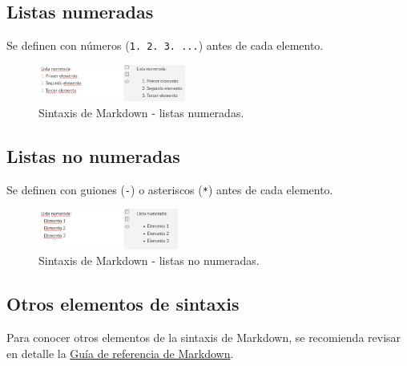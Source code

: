 \documentclass[
  letterpaper,
  DIV=11,
  numbers=noendperiod]{scrreprt}
\begin{document}
\hypertarget{listas-numeradas}{%
\subsection{Listas numeradas}\label{listas-numeradas}}

Se definen con números (\texttt{1.\ 2.\ 3.\ ...}) antes de cada
elemento.

\begin{figure}

{\centering \includegraphics[width=1.91in,height=\textheight]{./img/md-lista-numerada.png}

}

\caption{\label{fig-md-listas-numeradas}Sintaxis de Markdown - listas
numeradas.}

\end{figure}

\hypertarget{listas-no-numeradas}{%
\subsection{Listas no numeradas}\label{listas-no-numeradas}}

Se definen con guiones (\texttt{-}) o asteriscos (\texttt{*}) antes de
cada elemento.

\begin{figure}

{\centering \includegraphics[width=1.81in,height=\textheight]{./img/md-lista-no-numerada.png}

}

\caption{\label{fig-md-listas-no-numeradas}Sintaxis de Markdown - listas
no numeradas.}

\end{figure}

\hypertarget{otros-elementos-de-sintaxis}{%
\subsection{Otros elementos de
sintaxis}\label{otros-elementos-de-sintaxis}}

Para conocer otros elementos de la sintaxis de Markdown, se recomienda
revisar en detalle la \href{https://www.markdownguide.org/}{Guía de
referencia de Markdown}.
\end{document}
